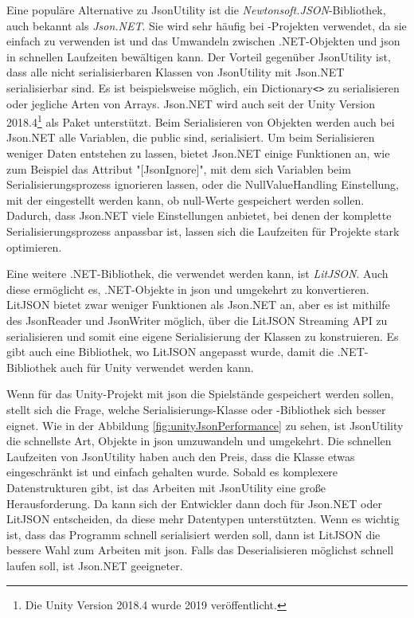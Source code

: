 Eine populäre Alternative zu JsonUtility ist die \textit{Newtonsoft.JSON}-Bibliothek, auch bekannt als \textit{Json.NET}. Sie wird sehr häufig bei \csharp{}-Projekten verwendet, da sie einfach zu verwenden ist und das Umwandeln zwischen .NET-Objekten und \ac{json} in schnellen Laufzeiten bewältigen kann.\cite{newtonsoftJsonNETNewtonsoft} Der Vorteil gegenüber JsonUtility ist, dass alle nicht serialisierbaren Klassen von JsonUtility mit Json.NET serialisierbar sind. Es ist beispielsweise möglich, ein Dictionary\texttt{<>} zu serialisieren\cite{newtonsoftSerializeDictionary}\cite{newtonsoftDeserializeDictionary} oder jegliche Arten von Arrays. Json.NET wird auch seit der Unity Version 2018.4\footnote{Die Unity Version 2018.4 wurde 2019 veröffentlicht.\cite{unityDownloadArchive}} als Paket unterstützt.\cite{NewtonsoftJsonUnitySupport} Beim Serialisieren von Objekten werden auch bei Json.NET alle Variablen, die public sind, serialisiert. Um beim Serialisieren weniger Daten entstehen zu lassen, bietet Json.NET einige Funktionen an, wie zum Beispiel das Attribut "[JsonIgnore]", mit dem sich Variablen beim Serialisierungsprozess ignorieren lassen, oder die NullValueHandling Einstellung, mit der eingestellt werden kann, ob null-Werte gespeichert werden sollen. Dadurch, dass Json.NET viele Einstellungen anbietet, bei denen der komplette Serialisierungsprozess anpassbar ist, lassen sich die Laufzeiten für Projekte stark optimieren.\cite{newtonsoftReducingSerialized}\cite{newtonsoftPerformanceTips}

Eine weitere .NET-Bibliothek, die verwendet werden kann, ist \textit{LitJSON}. Auch diese ermöglicht es, .NET-Objekte in \ac{json} und umgekehrt zu konvertieren.\cite{litjsonLitJSONDocumentation} LitJSON bietet zwar weniger Funktionen als Json.NET an, aber es ist mithilfe des JsonReader und JsonWriter möglich, über die LitJSON Streaming API zu serialisieren und somit eine eigene Serialisierung der Klassen zu konstruieren.\cite{litjsonLitJSONReaders} Es gibt auch eine Bibliothek, wo LitJSON angepasst wurde, damit die .NET-Bibliothek auch für Unity verwendet werden kann.\cite{githubGitHubMervillUnityLitJson}

Wenn für das Unity-Projekt mit \ac{json} die Spielstände gespeichert werden sollen, stellt sich die Frage, welche Serialisierungs-Klasse oder -Bibliothek sich besser eignet. Wie in der Abbildung \ref{fig:unityJsonPerformance} zu sehen, ist JsonUtility die schnellste Art, Objekte in \ac{json} umzuwandeln und umgekehrt. Die schnellen Laufzeiten von JsonUtility haben auch den Preis, dass die Klasse etwas eingeschränkt ist und einfach gehalten wurde. Sobald es komplexere Datenstrukturen gibt, ist das Arbeiten mit JsonUtility eine große Herausforderung. Da kann sich der Entwickler dann doch für Json.NET oder LitJSON entscheiden, da diese mehr Datentypen unterstützten. Wenn es wichtig ist, dass das Programm schnell serialisiert werden soll, dann ist LitJSON die bessere Wahl zum Arbeiten mit \ac{json}. Falls das Deserialisieren möglichst schnell laufen soll, ist Json.NET geeigneter.

